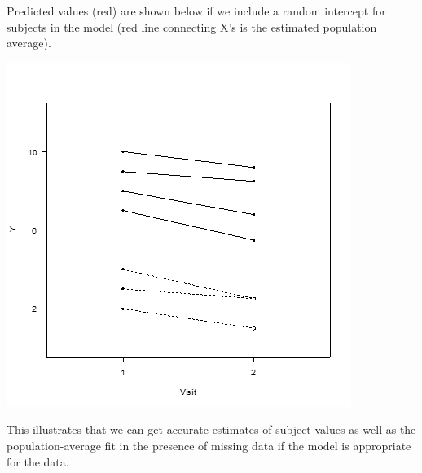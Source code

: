 \documentclass[
  9pt,
  ignorenonframetext,
]{beamer}
\begin{document}
\begin{frame}{}
\protect\hypertarget{section-1}{}
Predicted values (red) are shown below if we include a random intercept
for subjects in the model (red line connecting X's is the estimated
population average).

\begin{center}\includegraphics[width=0.7\linewidth]{figs_L20/f2} \end{center}

This illustrates that we can get accurate estimates of subject values as
well as the population-average fit in the presence of missing data if
the model is appropriate for the data.
\end{frame}
\end{document}
